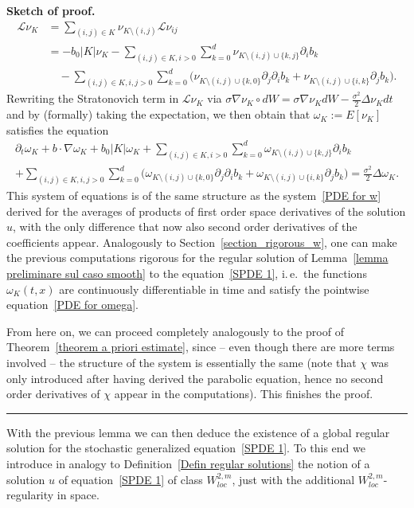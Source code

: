 \documentclass[a4paper,10pt]{article}
\newenvironment{proof}[1][Proof]{\noindent\textbf{#1.} }{\ \rule{0.5em}{0.5em}}
\begin{document}
\begin{proof}[Sketch of proof]
\begin{align*}
  \mathcal{L} \nu_K & = \sum_{(i,j) \in K} \nu_{K \setminus (i,j)} \mathcal{L} \nu_{ij} \\
  & = - b_0 |K| \nu_K - \sum_{(i,j) \in K, i>0} \sum_{k=0}^{d} \nu_{K \setminus (i,j) \cup \{k,j\} }\partial _i b_k \\
  & \quad {}- \sum_{(i,j) \in K, i,j>0} \sum_{k=0}^d \Big( \nu_{K \setminus (i,j) \cup \{k,0\} } \partial_{j} \partial_{i}b_k + \nu_{K \setminus (i,j) \cup \{i,k\} } \partial_j b_k \Big).
\end{align*}
Rewriting the Stratonovich term in $\mathcal{L} \nu_K$ via $\sigma \nabla \nu_{K}\circ dW=\sigma\nabla \nu_{K}dW-\frac{\sigma^{2}}{2}\Delta \nu_{K}dt$ and by (formally) taking the expectation, we then obtain that $\omega_K := E[\nu_K]$ satisfies the equation
\begin{multline}
\partial_{t} \omega_{K}+ b\cdot\nabla \omega_{K}+ b_0 |K| \omega_{K}
+ \sum_{(i,j) \in K, i>0} \sum_{k=0}^{d} \omega_{K \setminus (i,j) \cup \{k,j\} }\partial _i b_k \\
+ \sum_{(i,j) \in K, i,j>0} \sum_{k=0}^d \Big( \omega_{K \setminus (i,j) \cup \{k,0\} } \partial_{j} \partial_{i}b_k + \omega_{K \setminus (i,j) \cup \{i,k\} } \partial_j b_k \Big)
 = \frac{\sigma^{2}}{2} \Delta \omega_{K}. \label{PDE for omega}
\end{multline}
This system of equations is of the same structure as the system~\eqref{PDE for w} derived for the averages of products of first order space derivatives of the solution $u$, with the only difference that now also second order derivatives of the coefficients appear. Analogously to Section~\ref{section_rigorous_w}, one can make the previous computations rigorous for the regular solution of Lemma~\ref{lemma preliminare sul caso smooth} to the equation~\eqref{SPDE 1}, i.\,e.\ the functions $\omega_K(t,x)$ are continuously differentiable in time and satisfy the pointwise equation~\eqref{PDE for omega}.

From here on, we can proceed completely analogously to the proof of Theorem~\ref{theorem a priori estimate}, since -- even though there are more terms involved -- the structure of the system is essentially the same (note that $\chi$ was only introduced after having derived the parabolic equation, hence no second order derivatives of $\chi$ appear in the computations). This finishes the proof.
\end{proof}

With the previous lemma we can then deduce the existence of a global regular solution for the stochastic generalized equation~\eqref{SPDE 1}. To this end we introduce in analogy to Definition~\ref{Defin regular solutions} the notion of a solution $u$ of equation~\eqref{SPDE 1} of class $W_{loc}^{2,m}$, just with the additional $W_{loc}^{2,m}$-regularity in space.
\end{document}
